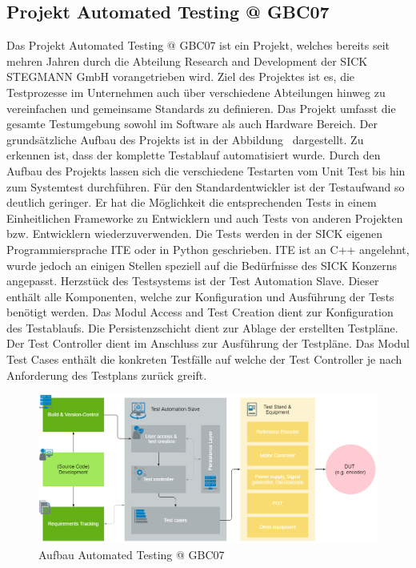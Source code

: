 \subsection{Projekt Automated Testing @ GBC07}\label{sec:Automated_Testing}
Das Projekt Automated Testing @ GBC07 ist ein Projekt, welches bereits seit mehren Jahren durch die Abteilung Research and Development der SICK STEGMANN GmbH vorangetrieben wird. Ziel des Projektes ist es, die Testprozesse im Unternehmen auch über verschiedene Abteilungen hinweg zu vereinfachen und gemeinsame Standards zu definieren. Das Projekt umfasst die gesamte Testumgebung sowohl im Software als auch Hardware Bereich. Der grundsätzliche Aufbau des Projekts ist in der Abbildung \dq {}\dq~dargestellt.
Zu erkennen ist, dass der komplette Testablauf automatisiert wurde. Durch den Aufbau des Projekts lassen sich die verschiedene Testarten vom Unit Test bis hin zum Systemtest durchführen. Für den Standardentwickler ist der Testaufwand so deutlich geringer. Er hat die Möglichkeit die entsprechenden Tests in einem Einheitlichen Frameworke zu Entwicklern und auch Tests von anderen Projekten bzw. Entwicklern wiederzuverwenden. Die Tests werden in der SICK eigenen Programmiersprache ITE oder in Python geschrieben. ITE ist an C++ angelehnt, wurde jedoch an einigen Stellen speziell auf die Bedürfnisse des SICK Konzerns angepasst. Herzstück des Testsystems ist der Test Automation Slave. Dieser enthält alle Komponenten, welche zur Konfiguration und Ausführung der Tests benötigt werden. Das Modul Access and Test Creation dient zur Konfiguration des Testablaufs. Die Persistenzschicht dient zur Ablage der erstellten Testpläne. Der Test Controller dient im Anschluss zur Ausführung der Testpläne. Das Modul Test Cases enthält die konkreten Testfälle auf welche der Test Controller je nach Anforderung des Testplans zurück greift.\cite{SICKAG.04.2021}
\begin{figure}[h]
	\centering
  \includegraphics[width=1.25\textwidth, angle=90]{img/automated_testing.png} 
   \caption[Aufbau Automated Testing @ GBC07]{Aufbau Automated Testing @ GBC07 \cite{SICKAG.04.2021}}
  \label{fig:autotest.jpg}
\end{figure}


